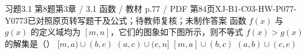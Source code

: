 \par\noindent\begin{minipage}{\linewidth}
\begin{bankitem}{习题3.1 第8题}{第3章 / 3.1 函数 / 教材 p.77 / PDF 第84页}{XJ-B1-C03-HW-P077-Y0773}{已对照原页转写题干及公式；待教师复核；未制作答案}
函数 $f(x)$ 与 $g(x)$ 的定义域均为 $[m,n]$，它们的图象如下图所示，则不等式 $f(x)>g(x)$ 的解集是（\quad）
$[m,a)\cup(b,e)$
$(a,c)\cup(e,n]$
$[m,a]\cup(b,c)$
$(a,b)\cup(c,e)$
\end{bankitem}
\end{minipage}\par\medskip
